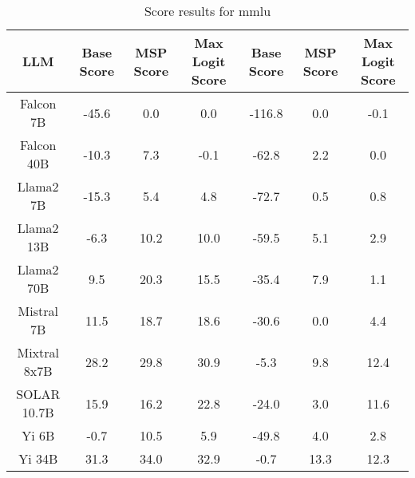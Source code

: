 \renewcommand\arraystretch{1.2}
\begin{table*}
\centering
\begin{tabular}{c|c|c|c|c|c|c}
LLM & Base Score & MSP Score & Max Logit Score & Base Score & MSP Score & Max Logit Score\\ \hline
Falcon 7B & -45.6 & 0.0 & 0.0 & -116.8 & 0.0 & -0.1\\
Falcon 40B & -10.3 & 7.3 & -0.1 & -62.8 & 2.2 & 0.0\\
Llama2 7B & -15.3 & 5.4 & 4.8 & -72.7 & 0.5 & 0.8\\
Llama2 13B & -6.3 & 10.2 & 10.0 & -59.5 & 5.1 & 2.9\\
Llama2 70B & 9.5 & 20.3 & 15.5 & -35.4 & 7.9 & 1.1\\
Mistral 7B & 11.5 & 18.7 & 18.6 & -30.6 & 0.0 & 4.4\\
Mixtral 8x7B & 28.2 & 29.8 & 30.9 & -5.3 & 9.8 & 12.4\\
SOLAR 10.7B & 15.9 & 16.2 & 22.8 & -24.0 & 3.0 & 11.6\\
Yi 6B & -0.7 & 10.5 & 5.9 & -49.8 & 4.0 & 2.8\\
Yi 34B & 31.3 & 34.0 & 32.9 & -0.7 & 13.3 & 12.3\\
\hline
\end{tabular}
\caption{Score results for mmlu}
\end{table*}
\label{tab:mmlu_score}
